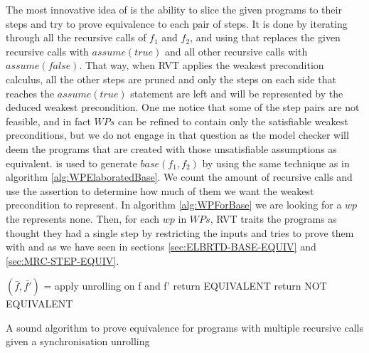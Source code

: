 The most innovative idea of  is the ability to slice the given programs to their steps and try to prove equivalence to each pair of steps. It is done by iterating through all the recursive calls of $f_1$ and $f_2$, and using  that replaces the given recursive calls with $assume(true)$ and all other recursive calls with $assume(false)$. That way, when RVT applies the weakest precondition calculus, all the other steps are pruned and only the steps on each side that reaches the $assume(true)$ statement are left and will be represented by the deduced weakest precondition. One me notice that some of the step pairs are not feasible, and in fact $WPs$ can be refined to contain only the satisfiable weakest preconditions, but we do not engage in that question as the model checker will deem the programs that are created with those unsatisfiable assumptions as equivalent.   
 is used to generate $base(f_1,f_2)$ by using the same technique as in algorithm \ref{alg:WPElaboratedBase}. We count the amount of recursive calls and use the assertion to determine how much of them we want the weakest precondition to represent. In algorithm \ref{alg:WPForBase} we are looking for a $wp$ the represents none. 
Then, for each $wp$ in $WPs$, RVT traits the programs as thought they had a single step by restricting the inputs and tries to prove them with  and  as we have seen in sections \ref{sec:ELBRTD-BASE-EQUIV} and \ref{sec:MRC-STEP-EQUIV}.
\iffalse
\noindent
\begin{algorithm}
\begin{minipage}{\linewidth}
\begin{algorithmic}[1]
	\State$(\bar{f},\bar{f'})$ = apply unrolling on f and f'
	\State	return EQUIVALENT
	\Else
	\State	return NOT EQUIVALENT
		\EndIf
	\EndFunction
\end{algorithmic}
\end{minipage}
\caption{A sound algorithm to prove equivalence for programs with multiple recursive calls given a synchronisation unrolling}
\label{alg:ProveWithUnrolling}
\end{algorithm}
   
